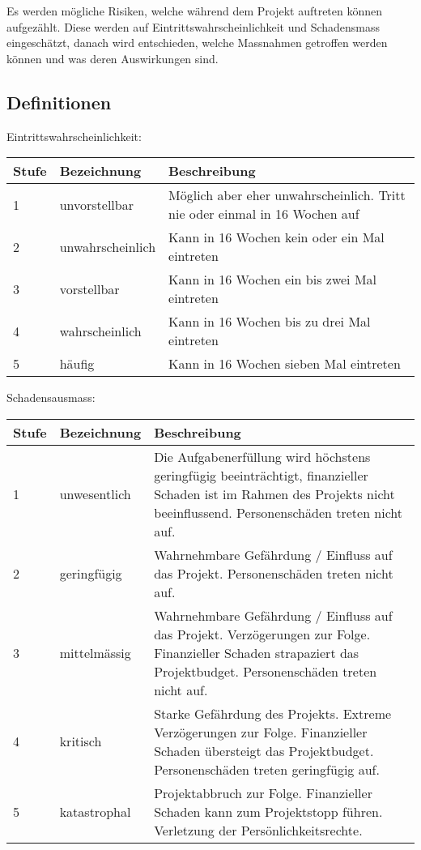 Es werden mögliche Risiken, welche während dem Projekt auftreten können aufgezählt. Diese werden auf Eintrittswahrscheinlichkeit und Schadensmass eingeschätzt, danach wird entschieden, welche Massnahmen getroffen werden können und was deren Auswirkungen sind.

\subsection{Definitionen}
\label{sssec:Def}
\vspace{1em}
\noindent
Eintrittswahrscheinlichkeit:

\vspace{1em}
\noindent
\begin{tabularx}{\textwidth}{|l|l|X|}
	\hline
	\textbf{Stufe} & \textbf{Bezeichnung} & \textbf{Beschreibung} \\
	\hline
	1 & unvorstellbar & Möglich aber eher unwahrscheinlich. Tritt nie oder einmal in 16 Wochen auf \\
	\hline
	2 & unwahrscheinlich & Kann in 16 Wochen kein oder ein Mal eintreten\\
	\hline
	3 & vorstellbar & Kann in 16 Wochen ein bis zwei Mal eintreten \\
	\hline
	4 & wahrscheinlich & Kann in 16 Wochen bis zu drei Mal eintreten \\
	\hline
	5 & häufig & Kann in 16 Wochen sieben Mal eintreten\\
	\hline
\end{tabularx}

\vspace{1em}
\noindent
Schadensausmass:

\vspace{1em}
\noindent
\begin{tabularx}{\textwidth}{|l|l|X|}
	\hline
	\textbf{Stufe} & \textbf{Bezeichnung} & \textbf{Beschreibung} \\
	\hline
	1 & unwesentlich & Die Aufgabenerfüllung wird höchstens geringfügig beeinträchtigt, finanzieller Schaden ist im Rahmen des Projekts nicht beeinflussend. Personenschäden treten nicht auf. \\
	\hline
	2 & geringfügig & Wahrnehmbare Gefährdung / Einfluss auf das Projekt. Personenschäden treten nicht auf. \\
	\hline
	3 & mittelmässig & Wahrnehmbare Gefährdung / Einfluss auf das Projekt. Verzögerungen zur Folge. Finanzieller Schaden strapaziert das Projektbudget. Personenschäden treten nicht auf. \\
	\hline
	4 & kritisch & Starke Gefährdung des Projekts. Extreme Verzögerungen zur Folge. Finanzieller Schaden übersteigt das Projektbudget. Personenschäden treten geringfügig auf.\\
	\hline
	5 & katastrophal & Projektabbruch zur Folge. Finanzieller Schaden kann zum Projektstopp führen. Verletzung der Persönlichkeitsrechte. \\
	\hline
\end{tabularx}

